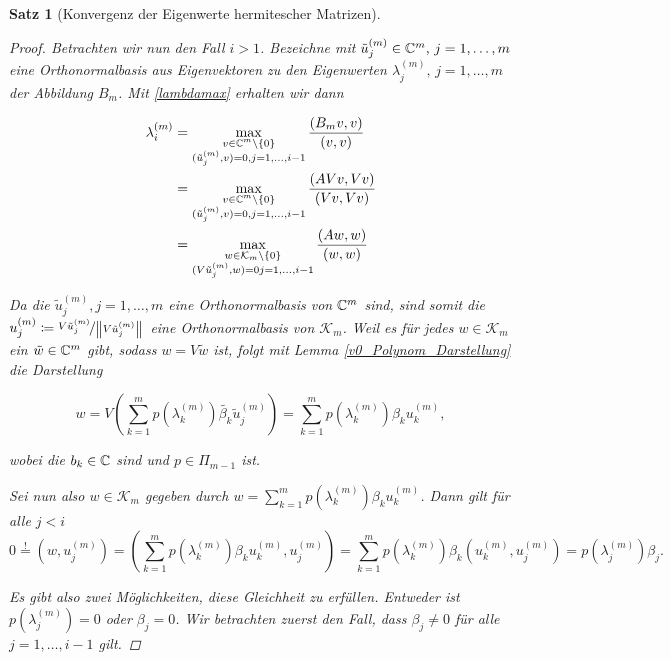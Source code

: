 \documentclass{article}
\theoremstyle{plain}
\newtheorem{theorem}    {Satz}   [section]
\begin{document}
\begin{theorem}[Konvergenz der Eigenwerte hermitescher Matrizen]
\begin{proof}
	Betrachten wir nun den Fall $i>1$.
	Bezeichne mit $\tilde{u}_j^{(m)} \in \mathbb{C}^m, \, j = 1,\dots, m$ eine Orthonormalbasis aus Eigenvektoren zu den Eigenwerten $\lambda_j^{(m)} , \, j = 1,\dots, m$ der Abbildung $B_m$. Mit \eqref{lambdamax} erhalten wir dann

	\begin{equation}
		\begin{aligned}
			\label{Darstellung EW}
			\lambda_i^{(m)} &= \max_{\substack{v\in \mathbb{C}^m\setminus \{0\} \\ (\tilde{u}_j^{(m)},v) = 0, j = 1,\dots,i-1}} \frac{(B_m v,v)}{(v,v)} \\
			&= \max_{\substack{v\in \mathbb{C}^m\setminus \{0\} \\ (\tilde{u}_j^{(m)},v) = 0, j = 1,\dots,i-1}} \frac{(AVv,Vv)}{(Vv,Vv)}\\
			&= \max_{\substack{w\in \mathcal{K}_m\setminus \{0\} \\ (V\tilde{u}_j^{(m)},w) = 0 j = 1,\dots,i-1}} \frac{(Aw,w)}{(w,w)}
		\end{aligned}
	\end{equation}

	Da die $\tilde{u}_j^{(m)}, j = 1,\dots,m$ eine Orthonormalbasis von $\mathbb{C}^m$ sind, sind somit die $u_j^{(m)} \coloneqq \nicefrac{V\tilde{u}_j^{(m)}}{{\left \| V\tilde{u}_j^{(m)} \right \|}_{}}$ eine Orthonormalbasis von $\mathcal{K}_m$. Weil es für jedes $w\in \mathcal{K}_m$ ein $\tilde{w} \in \mathbb{C}^m$ gibt, sodass $w = V \tilde{w}$ ist, folgt mit Lemma \ref{v0_Polynom_Darstellung} die Darstellung

	\begin{equation*}
		w = V \left(\sum_{k=1}^{m} p(\lambda_k^{(m)}) \tilde{\beta_k} \tilde{u}_j^{(m)}\right) = \sum_{k=1}^{m} p(\lambda_k^{(m)}) \beta_k u_k^{(m)},
	\end{equation*}

	wobei die $b_k \in \mathbb{C}$ sind und $p \in \Pi_{m-1}$ ist.
	
	Sei nun also $w\in \mathcal{K}_m$ gegeben durch $w = \sum_{k=1}^{m} p(\lambda_k^{(m)}) \beta_k u_k^{(m)}$.
	Dann gilt für alle $j < i$
	\begin{equation*}
		0 \stackrel{!}{=} (w,u_j^{(m)}) = (\sum_{k=1}^{m} p(\lambda_k^{(m)}) \beta_k u_k^{(m)},u_j^{(m)}) = \sum_{k=1}^{m} p(\lambda_k^{(m)}) \beta_k (u_k^{(m)},u_j^{(m)}) = p(\lambda_j^{(m)}) \beta_j.
	\end{equation*}

	Es gibt also zwei Möglichkeiten, diese Gleichheit zu erfüllen. Entweder ist $p(\lambda_j^{(m)}) = 0$ oder $\beta_j = 0$. Wir betrachten zuerst den Fall, dass  $\beta_j \neq 0$ für alle $j = 1,\dots, i-1$ gilt.


\end{proof}
\end{theorem}
\end{document}
